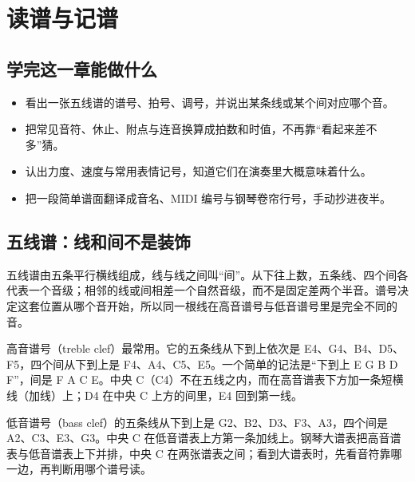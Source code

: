 \clearpage
\chapter{读谱与记谱}


\label{sec:reading-notation}

\section*{学完这一章能做什么}
\begin{itemize}
  \item 看出一张五线谱的谱号、拍号、调号，并说出某条线或某个间对应哪个音。
  \item 把常见音符、休止、附点与连音换算成拍数和时值，不再靠“看起来差不多”猜。
  \item 认出力度、速度与常用表情记号，知道它们在演奏里大概意味着什么。
  \item 把一段简单谱面翻译成音名、MIDI 编号与钢琴卷帘行号，手动抄进夜半。
\end{itemize}

\section{五线谱：线和间不是装饰}

五线谱由五条平行横线组成，线与线之间叫“间”。从下往上数，五条线、四个间各代表一个音级；相邻的线或间相差一个自然音级，而不是固定差两个半音。谱号决定这套位置从哪个音开始，所以同一根线在高音谱号与低音谱号里是完全不同的音。

高音谱号（treble clef）最常用。它的五条线从下到上依次是 E4、G4、B4、D5、F5，四个间从下到上是 F4、A4、C5、E5。一个简单的记法是“下到上 E G B D F”，间是 F A C E。中央 C（C4）不在五线之内，而在高音谱表下方加一条短横线（加线）上；D4 在中央 C 上方的间里，E4 回到第一线。

低音谱号（bass clef）的五条线从下到上是 G2、B2、D3、F3、A3，四个间是 A2、C3、E3、G3。中央 C 在低音谱表上方第一条加线上。钢琴大谱表把高音谱表与低音谱表上下并排，中央 C 在两张谱表之间；看到大谱表时，先看音符靠哪一边，再判断用哪个谱号读。

